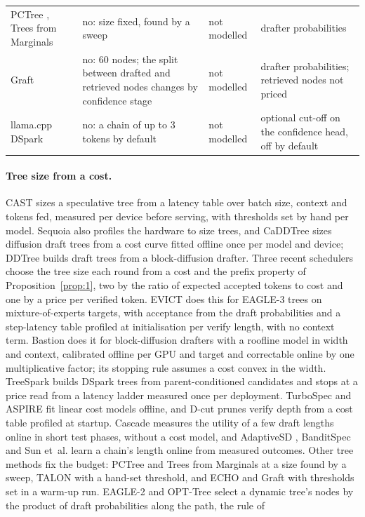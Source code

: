 \documentclass[10pt,twocolumn,letterpaper]{article}
\begin{document}
\begin{table}[t]
\begin{tabularx}{\textwidth}{lXXX}
PCTree \cite{li2026chains}, Trees from Marginals \cite{oda2026trees} & no: size fixed, found by a sweep & not modelled & drafter probabilities \\
Graft \cite{shen2026draft} & no: 60 nodes; the split between drafted and retrieved nodes changes by confidence stage & not modelled & drafter probabilities; retrieved nodes not priced \\
llama.cpp DSpark \cite{gerganovndllama} & no: a chain of up to 3 tokens by default & not modelled & optional cut-off on the confidence head, off by default \\
\bottomrule
\end{tabularx}
\end{table}

\paragraph{Tree size from a cost.} CAST \cite{hong2026inference} sizes a speculative tree from a latency table over batch size, context and tokens fed, measured per device before serving, with thresholds set by hand per model. Sequoia \cite{chen2024sequoia} also profiles the hardware to size trees, and CaDDTree \cite{zhang2026cost} sizes diffusion draft trees from a cost curve fitted offline once per model and device; DDTree \cite{ringel2026accelerating} builds draft trees from a block-diffusion drafter. Three recent schedulers choose the tree size each round from a cost and the prefix property of Proposition~\ref{prop:1}, two by the ratio of expected accepted tokens to cost and one by a price per verified token. EVICT \cite{pan2026making} does this for EAGLE-3 trees on mixture-of-experts targets, with acceptance from the draft probabilities and a step-latency table profiled at initialisation per verify length, with no context term. Bastion \cite{oh2026bastion} does it for block-diffusion drafters with a roofline model in width and context, calibrated offline per GPU and target and correctable online by one multiplicative factor; its stopping rule assumes a cost convex in the width. TreeSpark \cite{zhou2026treespark} builds DSpark trees from parent-conditioned candidates and stops at a price read from a latency ladder measured once per deployment. TurboSpec \cite{liu2024turbospec} and ASPIRE \cite{ziashahabi2026aspire} fit linear cost models offline, and D-cut \cite{liu2026d} prunes verify depth from a cost table profiled at startup. Cascade \cite{saxena2025utility} measures the utility of a few draft lengths online in short test phases, without a cost model, and AdaptiveSD \cite{saremi2026adaptivesd}, BanditSpec \cite{hou2025banditspec} and Sun et~al. \cite{sun2026delay} learn a chain's length online from measured outcomes. Other tree methods fix the budget: PCTree \cite{li2026chains} and Trees from Marginals \cite{oda2026trees} at a size found by a sweep, TALON \cite{liu2026talon} with a hand-set threshold, and ECHO \cite{hu2026echo} and Graft \cite{shen2026draft} with thresholds set in a warm-up run. EAGLE-2 \cite{li2024eagleb} and OPT-Tree \cite{wang2025opt} select a dynamic tree's nodes by the product of draft probabilities along the path, the rule of 
\end{document}
